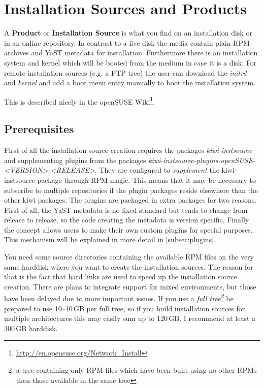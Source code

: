 \chapter{Installation Sources and Products}
\label{chapter:instsrc}
\minitoc


A \textbf{Product} or \textbf{Installation Source} is what you find on an
installation disk or in an online repository. In contrast to a live disk the
media contain plain RPM archives and YaST metadata for installation. Furthermore
there is an installation system and kernel which will be booted from the medium
in case it is a disk. For remote installation sources (e.g. a FTP tree) the user
can download the \textit{initrd} and \textit{kernel} and add a boot menu entry
manually to boot the installation system.

This is described nicely in the openSUSE Wiki\footnote{
\href{http://en.opensuse.org/Network\_Install}{http://en.opensuse.org/Network\_Install}}.


\section{Prerequisites}
\label{sec:prereq}

First of all the installation source creation requires the packages
\textit{kiwi-instsource} and supplementing plugins from the packages
\textit{kiwi-inst\-source-plugins-open\-SU\-SE-<VERSION>-<RELEASE>}.
They are configured to \textit{supplement} the kiwi-inst\-source
package through RPM magic. This means that it may be necessary to subscribe to
multiple repositories if the plugin packages reside elsewhere than the other
kiwi packages. The plugins are packaged in extra packages for two reasons.
First of all, the YaST metadata is no fixed standard but tends to change from
release to release, so the code creating the metadata is version specific.
Finally the concept allows users to make their own
custom plugins for special purposes. This mechanism will be explained in more
detail in \vref{subsec:plugins}.

You need some source directories containing the available RPM files on the very
same harddisk where you want to create the installation sources. The reason for
that is the fact that hard links are used to speed up the installation source
creation. There are plans to integrate support for mixed environments, but those
have been delayed due to more important issues. If you use a \textit{full
tree\footnote{a tree containing only RPM files which have been built using no
other RPMs then those available in the same tree}} be prepared to use 10--10\,GB
per full tree, so if you build installation sources for multiple architectures
this may easily sum up to 120\,GB. I recommend at least a 300\,GB harddisk.

